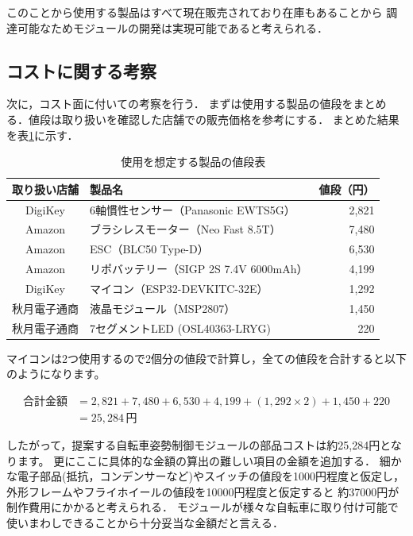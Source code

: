 \documentclass[uplatex,dvipdfmx]{jsarticle}
\begin{document}
このことから使用する製品はすべて現在販売されており在庫もあることから
調達可能なためモジュールの開発は実現可能であると考えられる．


\subsection{コストに関する考察}

次に，コスト面に付いての考察を行う．
まずは使用する製品の値段をまとめる．値段は取り扱いを確認した店舗での販売価格を参考にする．
まとめた結果を表\ref{table:Price}に示す．

\begin{table}[h]
  \centering
  \caption{使用を想定する製品の値段表}
  \label{table:Price}
  \begin{tabular}{clr}
\hline
取り扱い店舗 & 製品名 & 値段（円） \\\hline \hline
DigiKey & 6軸慣性センサー（Panasonic EWTS5G） & 2,821 \\\hline
Amazon & ブラシレスモーター（Neo Fast 8.5T） & 7,480 \\\hline
Amazon & ESC（BLC50 Type-D） & 6,530  \\\hline
Amazon & リポバッテリー（SIGP 2S 7.4V 6000mAh） & 4,199 \\\hline
DigiKey & マイコン（ESP32-DEVKITC-32E） & 1,292 \\\hline
秋月電子通商 & 液晶モジュール（MSP2807） & 1,450 \\\hline
秋月電子通商 & 7セグメントLED (OSL40363-LRYG) & 220 \\\hline
  \end{tabular}
\end{table}

マイコンは2つ使用するので2個分の値段で計算し，全ての値段を合計すると以下のようになります。

\begin{align*}
\text{合計金額} &= 2,821 + 7,480 + 6,530 + 4,199 + (1,292 \times 2) + 1,450 + 220 \\
&= 25,284 \, \text{円}
\end{align*}

したがって，提案する自転車姿勢制御モジュールの部品コストは約25,284円となります。
更にここに具体的な金額の算出の難しい項目の金額を追加する．
細かな電子部品(抵抗，コンデンサーなど)やスイッチの値段を1000円程度と仮定し，
外形フレームやフライホイールの値段を10000円程度と仮定すると
約37000円が制作費用にかかると考えられる．
モジュールが様々な自転車に取り付け可能で使いまわしできることから十分妥当な金額だと言える．
\end{document}
